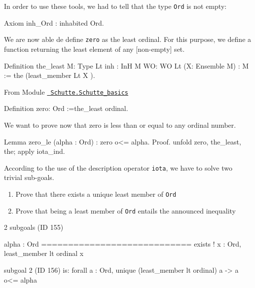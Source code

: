 In order to use these tools,  we had to tell \coq{}  that the type \texttt{Ord} is not empty:

\begin{Coqsrc}
Axiom inh_Ord : inhabited Ord.
\end{Coqsrc}


We are now able de define \texttt{zero} as the least ordinal. For this purpose,
we define a function returning the least element of any [non-empty]  set.


\begin{Coqsrc}
Definition the_least {M: Type} {Lt}
           {inh : InH M} {WO: WO Lt} (X: Ensemble M)  : M :=
  the  (least_member  Lt X ).
\end{Coqsrc}


\vspace{4pt}

From Module \href{../src/html/hydras.Schutte.Schutte_basics.html}%
{\texttt{~Schutte.Schutte\_basics}}

\label{Constants:zero:Ord}

\begin{Coqsrc}
Definition zero: Ord :=the_least ordinal.
\end{Coqsrc}

We want to prove now that zero is less than or equal to any ordinal number.

\begin{Coqsrc}
Lemma zero_le (alpha : Ord) :  zero o<= alpha.
Proof.
  unfold zero, the_least, the; apply iota_ind.
\end{Coqsrc}

According to the use of the description operator \texttt{iota}, we have to solve  two trivial sub-goals.
\begin{enumerate}
\item Prove that there exists a unique least member of \texttt{Ord}
\item Prove that being a least member of \texttt{Ord} entails the announced inequality 
\end{enumerate}


\begin{Coqanswer}
2 subgoals (ID 155)
  
  alpha : Ord
  ============================
  exists ! x : Ord, least_member lt ordinal x

subgoal 2 (ID 156) is:
 forall a : Ord, unique (least_member lt ordinal) a -> 
                a o<= alpha
\end{Coqanswer}

